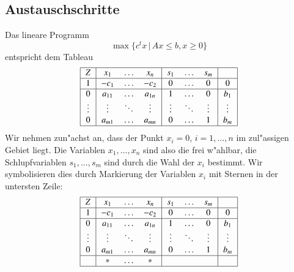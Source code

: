 \subsection{Austauschschritte\label{lp:subsection:austausch}}
Das lineare Programm
\[
\max\{ c^tx\,|\, Ax\le b, x\ge 0\}
\]
entspricht dem Tableau
\begin{equation}
\begin{tabular}{|
>{$}c<{$}|
>{$}c<{$}
>{$}c<{$}
>{$}c<{$}|
>{$}c<{$}
>{$}c<{$}
>{$}c<{$}|
>{$}c<{$}|}
\hline
Z&x_1&\dots&x_n&s_1&\dots&s_m&\\
\hline
1&-c_1&\dots&-c_2&0&\dots&0&0\\
\hline
0&a_{11}&\dots&a_{1n}&1&\dots&0&b_1\\
\vdots&\vdots&\ddots&\vdots&\vdots&\ddots&\vdots&\vdots\\
0&a_{m1}&\dots&a_{mn}&0&\dots&1&b_m\\
\hline
\end{tabular}
\end{equation}
Wir nehmen zun"achst an, dass der Punkt $x_i=0$, $i=1,\dots,n$ 
im zul"assigen Gebiet liegt.
Die Variablen $x_1,\dots,x_n$ sind also die frei w"ahlbar, die
Schlupfvariablen $s_1,\dots,s_m$ sind durch die Wahl der
$x_i$ bestimmt.
Wir symbolisieren dies durch Markierung der Variablen $x_i$ mit
Sternen in der untersten Zeile:
\begin{equation}
\begin{tabular}{|
>{$}c<{$}|
>{$}c<{$}
>{$}c<{$}
>{$}c<{$}|
>{$}c<{$}
>{$}c<{$}
>{$}c<{$}|
>{$}c<{$}|}
\hline
Z&x_1&\dots&x_n&s_1&\dots&s_m&\\
\hline
1&-c_1&\dots&-c_2&0&\dots&0&0\\
\hline
0&a_{11}&\dots&a_{1n}&1&\dots&0&b_1\\
\vdots&\vdots&\ddots&\vdots&\vdots&\ddots&\vdots&\vdots\\
0&a_{m1}&\dots&a_{mn}&0&\dots&1&b_m\\
\hline
 &*&\dots&*& && & \\
\hline
\end{tabular}
\end{equation}

